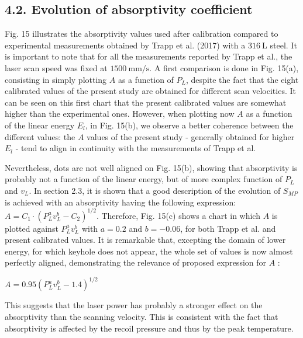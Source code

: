 \documentclass[10pt]{article}
\begin{document}
\subsection*{4.2. Evolution of absorptivity coefficient}
Fig. 15 illustrates the absorptivity values used after calibration compared to experimental measurements obtained by Trapp et al. (2017) with a $316 \mathrm{~L}$ steel. It is important to note that for all the measurements reported by Trapp et al., the laser scan speed was fixed at $1500 \mathrm{~mm} / \mathrm{s}$. A first comparison is done in Fig. 15(a), consisting in simply plotting $A$ as a function of $P_{L}$, despite the fact that the eight calibrated values of the present study are obtained for different scan velocities. It can be seen on this first chart that the present calibrated values are somewhat higher than the experimental ones. However, when plotting now $A$ as a function of the linear energy $E_{l}$, in Fig. 15(b), we observe a better coherence between the different values: the $A$ values of the present study - generally obtained for higher $E_{l}$ - tend to align in continuity with the measurements of Trapp et al.

Nevertheless, dots are not well aligned on Fig. 15(b), showing that absorptivity is probably not a function of the linear energy, but of more complex function of $P_{L}$ and $v_{L}$. In section 2.3, it is shown that a good description of the evolution of $S_{M P}$ is achieved with an absorptivity having the following expression: $A=C_{1} \cdot\left(P_{L}^{a} v_{L}^{b}-C_{2}\right)^{1 / 2}$. Therefore, Fig. 15(c) shows a chart in which $A$ is plotted against $P_{L}^{a} v_{L}^{b}$ with $a=0.2$ and $b=-0.06$, for both Trapp et al. and present calibrated values. It is remarkable that, excepting the domain of lower energy, for which keyhole does not appear, the whole set of values is now almost perfectly aligned, demonstrating the relevance of proposed expression for $A$ :

$A=0.95\left(P_{L}^{a} v_{L}^{b}-1.4\right)^{1 / 2}$

This suggests that the laser power has probably a stronger effect on the absorptivity than the scanning velocity. This is consistent with the fact that absorptivity is affected by the recoil pressure and thus by the peak temperature.
\end{document}
